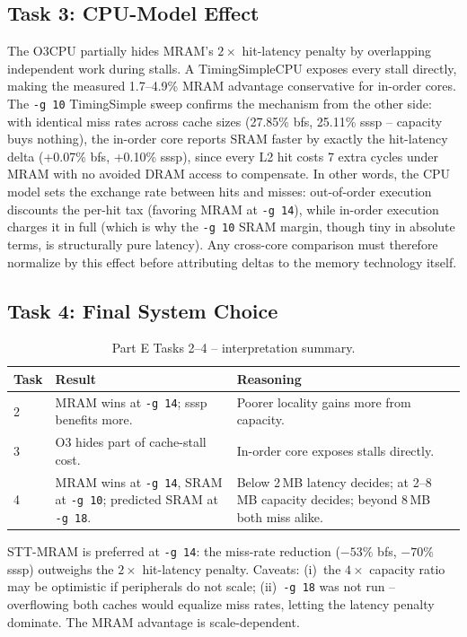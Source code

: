 \documentclass[a4paper,11pt]{article}
\begin{document}
\subsection*{Task 3: CPU-Model Effect}

The O3CPU partially hides MRAM's $2\times$ hit-latency penalty by overlapping independent work during stalls. A TimingSimpleCPU exposes every stall directly, making the measured 1.7--4.9\% MRAM advantage conservative for in-order cores. The \texttt{-g\,10} TimingSimple sweep confirms the mechanism from the other side: with identical miss rates across cache sizes (27.85\% bfs, 25.11\% sssp -- capacity buys nothing), the in-order core reports SRAM faster by exactly the hit-latency delta (+0.07\% bfs, +0.10\% sssp), since every L2 hit costs 7 extra cycles under MRAM with no avoided DRAM access to compensate. In other words, the CPU model sets the exchange rate between hits and misses: out-of-order execution discounts the per-hit tax (favoring MRAM at \texttt{-g\,14}), while in-order execution charges it in full (which is why the \texttt{-g\,10} SRAM margin, though tiny in absolute terms, is structurally pure latency). Any cross-core comparison must therefore normalize by this effect before attributing deltas to the memory technology itself.

\subsection*{Task 4: Final System Choice}

\begin{table}[H]
\centering
\small
\begin{tabularx}{\textwidth}{l X X}
\toprule
\textbf{Task} & \textbf{Result} & \textbf{Reasoning} \\
\midrule
2 & MRAM wins at \texttt{-g\,14}; sssp benefits more. & Poorer locality gains more from capacity. \\[0.2em]
3 & O3 hides part of cache-stall cost. & In-order core exposes stalls directly. \\[0.2em]
4 & MRAM wins at \texttt{-g\,14}, SRAM at \texttt{-g\,10}; predicted SRAM at \texttt{-g\,18}. & Below 2\,MB latency decides; at 2--8\,MB capacity decides; beyond 8\,MB both miss alike. \\
\bottomrule
\end{tabularx}
\caption{Part E Tasks 2--4 -- interpretation summary.}
\end{table}

STT-MRAM is preferred at \texttt{-g\,14}: the miss-rate reduction ($-53\%$ bfs, $-70\%$ sssp) outweighs the $2\times$ hit-latency penalty. Caveats: (i)~the $4\times$ capacity ratio may be optimistic if peripherals do not scale; (ii)~\texttt{-g\,18} was not run -- overflowing both caches would equalize miss rates, letting the latency penalty dominate. The MRAM advantage is scale-dependent.
\end{document}
